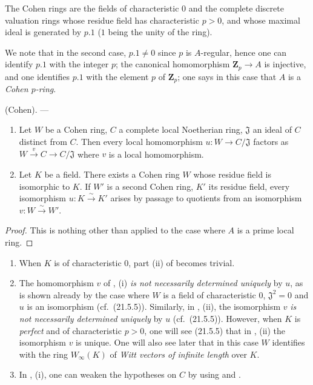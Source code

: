 \begin{proposition}[19.8.5]
\label{0.19.8.5}
The Cohen rings are the fields of characteristic $0$ and the complete discrete valuation rings whose residue field has characteristic $p>0$, and whose maximal ideal is generated by $p.1$ ($1$ being the unity of the ring).
\end{proposition}

We note that in the second case, $p.1\neq 0$ since $p$ is $A$-regular, hence one can identify $p.1$ with the integer $p$; the canonical homomorphism $\mathbf{Z}_p\to A$ is injective, and one identifies $p.1$ with the element $p$ of $\mathbf{Z}_p$; one says in this case that $A$ is a \emph{Cohen $p$-ring}.

\begin{theorem}[19.8.6]
\label{0.19.8.6}
\textup{(Cohen).} ---
\begin{enumerate}
  \item[\rm(i)] Let $W$ be a Cohen ring, $C$ a complete local Noetherian ring, $\mathfrak{J}$ an ideal of $C$ distinct from $C$.
Then every local homomorphism $u:W\to C/\mathfrak{J}$ factors as $W\xrightarrow{v}C\to C/\mathfrak{J}$ where $v$ is a local homomorphism.
  \item[\rm(ii)] Let $K$ be a field.
There exists a Cohen ring $W$ whose residue field is isomorphic to $K$.
If $W'$ is a second Cohen ring, $K'$ its residue field, every isomorphism $u:K\xrightarrow{\sim}K'$ arises by passage to quotients from an isomorphism $v:W\xrightarrow{\sim}W'$.
\end{enumerate}
\end{theorem}

\begin{proof}
This is nothing other than  applied to the case where $A$ is a prime local ring.
\end{proof}

\begin{remarks}[19.8.7]
\label{0.19.8.7}
\begin{enumerate}
  \item[\rm(i)] When $K$ is of characteristic $0$, part (ii) of  becomes trivial.
  \item[\rm(ii)] The homomorphism $v$ of , (i) \emph{is not necessarily determined uniquely} by $u$, as is shown already by the case where $W$ is a field of characteristic $0$, $\mathfrak{J}^2=0$ and $u$ is an isomorphism (cf.\ (21.5.5)).
Similarly, in , (ii), the isomorphism $v$ \emph{is not necessarily determined uniquely} by $u$ (cf.\ (21.5.5)).
However, when $K$ is \emph{perfect} and of characteristic $p>0$, one will see (21.5.5) that in , (ii) the isomorphism $v$ is unique.
One will also see later that in this case $W$ identifies with the ring $W_\infty(K)$ of \emph{Witt vectors of infinite length} over $K$.
  \item[\rm(iii)] In , (i), one can weaken the hypotheses on $C$ by using  and .
\end{enumerate}
\end{remarks}

